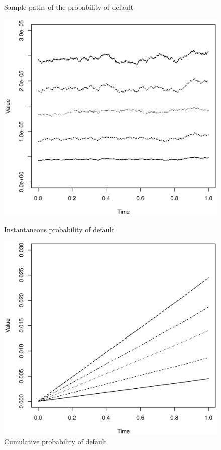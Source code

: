 \documentclass[12pt]{article}
\theoremstyle{definition}
\begin{document}
\begin{figure}[htb]
\begin{framed}
Sample paths of the probability of default\newline
\begin{minipage}[t]{.48\textwidth}
\centering
\includegraphics[width=1\textwidth]{StahlPaper2P}
\caption{Instantaneous probability of default \label{fig3}}
\end{minipage}\hfill
\begin{minipage}[t]{.48\textwidth}
\centering
\includegraphics[width=1\textwidth]{StahlPaper2PY}
\caption{Cumulative probability of default \label{fig4}}
\end{minipage}\hfill
\end{framed}
\end{figure}
\end{document}
